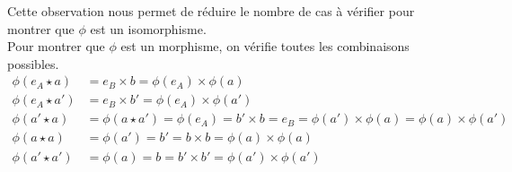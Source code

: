 \documentclass[11pt, a4paper, twoside]{article}
\begin{document}
Cette observation nous permet de réduire le nombre de cas à vérifier pour montrer que $\phi$ est un isomorphisme.\\
Pour montrer que $\phi$ est un morphisme, on vérifie toutes les combinaisons possibles.
\begin{align*}
	\phi( e_A \star a) &= e_B \times b = \phi( e_A) \times \phi( a) \\
	\phi( e_A \star a') &= e_B \times b' = \phi( e_A)  \times \phi( a')\\
	\phi( a' \star a) &= \phi(a \star a') = \phi( e_A)  = b' \times b = e_B=\phi( a') \times \phi( a) = \phi( a) \times \phi( a') \\
	\phi(a \star a) &= \phi( a') = b' = b \times b = \phi( a) \times \phi( a)\\
	\phi( a' \star a') &= \phi( a) = b = b' \times b' = \phi( a') \times \phi( a') 
\end{align*}
\end{document}
